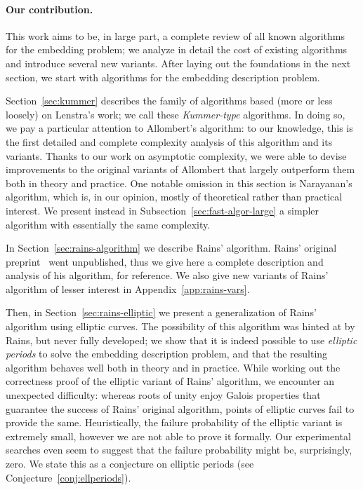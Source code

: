 \paragraph{\bf Our contribution.}
This work aims to be, in large part, a complete review of all known
algorithms for the embedding problem; we analyze in detail the cost of 
existing algorithms and introduce several new variants. %
After laying out the foundations in the next section, we start with
algorithms for the embedding description problem. %

Section~\ref{sec:kummer} describes the family of algorithms based
(more or less loosely) on Lenstra's work; we call these
\emph{Kummer-type} algorithms. %
In doing so, we pay a particular attention to Allombert's algorithm:
to our knowledge, this is the first detailed and complete complexity
analysis of this algorithm and its variants. %
Thanks to our work on asymptotic complexity, we were able to devise
improvements to the original variants of Allombert that largely
outperform them both in theory and practice. %
One notable omission in this section is Narayanan's algorithm, which
is, in our opinion, mostly of theoretical rather than practical
interest. %
We present instead in Subsection~\ref{sec:fast-algor-large} a simpler
algorithm with essentially the same complexity.

In Section~\ref{sec:rains-algorithm} we describe Rains' algorithm. %
Rains' original preprint~\cite{rains2008} went unpublished, thus we
give here a complete description and analysis of his algorithm, for
reference. %
We also give new variants of Rains' algorithm of lesser
interest in Appendix~\ref{app:rains-vars}.

Then, in Section~\ref{sec:rains-elliptic} we present a generalization
of Rains' algorithm using elliptic curves. %
The possibility of this algorithm was hinted at by Rains, but never
fully developed; we show that it is indeed possible to use
\emph{elliptic periods} to solve the embedding description problem,
and that the resulting algorithm behaves well both in theory and in
practice. %
While working out the correctness proof of the elliptic variant of
Rains' algorithm, we encounter an unexpected difficulty: whereas roots
of unity enjoy Galois properties that guarantee the success of Rains'
original algorithm, points of elliptic curves fail to provide the
same. %
Heuristically, the failure probability of the elliptic variant is
extremely small, however we are not able to prove it formally. %
Our experimental searches even seem to suggest that the failure
probability might be, surprisingly, zero. %
We state this as a conjecture on elliptic periods (see
Conjecture~\ref{conj:ellperiods}).

